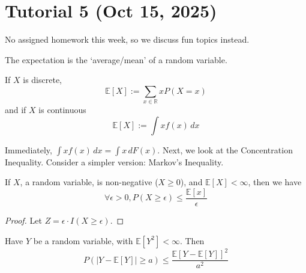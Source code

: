 \section{Tutorial 5 (Oct 15, 2025)}

No assigned homework this week, so we discuss fun topics instead.

The expectation is the `average/mean' of a random variable.
\begin{definition}[Expectation]
If $X$ is discrete,
\[
    \mathbb{E}[X] := \sum_{x \in \mathbb{R}} x P(X = x)
\]
and if $X$ is continuous
\[
    \mathbb{E}[X] := \int x f(x) \, dx
\]
\end{definition}
Immediately, $\int x f(x) \, dx = \int x \, dF(x)$. Next, we look at the Concentration Inequality. Consider a simpler version: Markov's Inequality.

\begin{simplethm}
    If $X$, a random variable, is non-negative ($X \geq 0$), and $\mathbb{E}[X] < \infty$, then we have
    \[
    \forall \epsilon > 0, P(X \geq \epsilon) \leq \frac{\mathbb{E}[x]}{\epsilon}
    \]
\end{simplethm}

\begin{proof}
    Let $Z = \epsilon \cdot I(X \geq \epsilon)$.
\end{proof}

\begin{simplethm}
    Have $Y$ be a random variable, with $\mathbb{E}[Y^2] < \infty$. Then
\[
    P(|Y - \mathbb{E}[Y]| \geq a) \leq \frac{\mathbb{E}[Y - \mathbb{E}[Y]]^2}{a^2}
\]
\end{simplethm}
